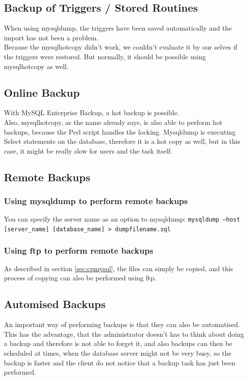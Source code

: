 \documentclass[10pt]{article}
\begin{document}
\subsection{Backup of Triggers / Stored Routines}
When using mysqldump, the triggers have been saved automatically and the import has not been a problem. \\
Because the mysqlhotcopy didn't work, we couldn't evaluate it by our selves if the triggers were restored. But normally, it should be possible using mysqlhotcopy as well.

\subsection{Online Backup}
With MySQL Enterprise Backup, a hot backup is possible. \\
Also, mysqlhotcopy, as the name already says, is also able to perform hot backups, because the Perl script handles the locking.
Mysqldump is executing Select statements on the database, therefore it is a hot copy as well, but in this case, it might be really slow for users and the task itself.
\subsection{Remote Backups}
\subsubsection{Using mysqldump to perform remote backups}
You can specify the server name as an option to mysqldump: 
\texttt{mysqldump --host [server\_name] [database\_name] \textgreater ~dumpfilename.sql}
\subsubsection{Using ftp to perform remote backups}
As described in section \ref{sec:cpmysql}, the files can simply be copied, and this process of copying can also be performed using ftp.
\subsection{Automised Backups}
An important way of performing backups is that they can also be automatised. This has the advantage, that the administrator doesn't has to think about doing a backup and therefore is not able to forget it, and also backups can then be scheduled at times, when the database server might not be very busy, so the backup is faster and the client do not notice that a backup task has just been performed. 
\end{document}
